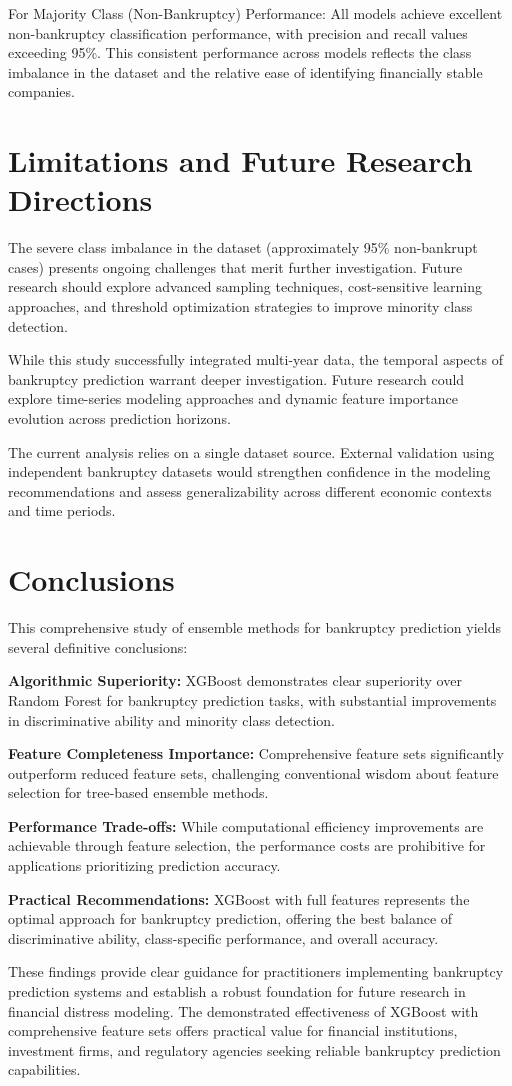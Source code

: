For Majority Class (Non-Bankruptcy) Performance:
All models achieve excellent non-bankruptcy classification performance, with precision and recall values exceeding 95\%. This consistent performance across models reflects the class imbalance in the dataset and the relative ease of identifying financially stable companies.

\section*{Limitations and Future Research Directions}

The severe class imbalance in the dataset (approximately 95\% non-bankrupt cases) presents ongoing challenges that merit further investigation. Future research should explore advanced sampling techniques, cost-sensitive learning approaches, and threshold optimization strategies to improve minority class detection.

While this study successfully integrated multi-year data, the temporal aspects of bankruptcy prediction warrant deeper investigation. Future research could explore time-series modeling approaches and dynamic feature importance evolution across prediction horizons.

The current analysis relies on a single dataset source. External validation using independent bankruptcy datasets would strengthen confidence in the modeling recommendations and assess generalizability across different economic contexts and time periods.

\section*{Conclusions}

This comprehensive study of ensemble methods for bankruptcy prediction yields several definitive conclusions:

\textbf{Algorithmic Superiority:} XGBoost demonstrates clear superiority over Random Forest for bankruptcy prediction tasks, with substantial improvements in discriminative ability and minority class detection.

\textbf{Feature Completeness Importance:} Comprehensive feature sets significantly outperform reduced feature sets, challenging conventional wisdom about feature selection for tree-based ensemble methods.

\textbf{Performance Trade-offs:} While computational efficiency improvements are achievable through feature selection, the performance costs are prohibitive for applications prioritizing prediction accuracy.

\textbf{Practical Recommendations:} XGBoost with full features represents the optimal approach for bankruptcy prediction, offering the best balance of discriminative ability, class-specific performance, and overall accuracy.

These findings provide clear guidance for practitioners implementing bankruptcy prediction systems and establish a robust foundation for future research in financial distress modeling. The demonstrated effectiveness of XGBoost with comprehensive feature sets offers practical value for financial institutions, investment firms, and regulatory agencies seeking reliable bankruptcy prediction capabilities. 